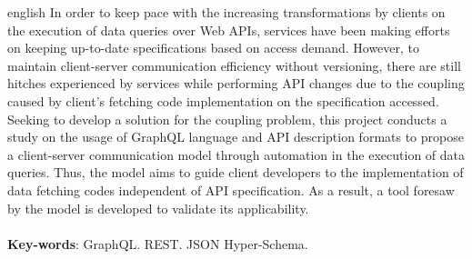\begin{resumo}[Abstract]
  \begin{otherlanguage*}{english}
    In order to keep pace with the increasing transformations by clients on the execution of data queries over Web APIs, services have been making efforts on keeping up-to-date specifications based on access demand. However, to maintain client-server communication efficiency without versioning, there are still hitches experienced by services while performing API changes due to the coupling caused by client's fetching code implementation on the specification accessed. Seeking to develop a solution for the coupling problem, this project conducts a study on the usage of GraphQL language and API description formats to propose a client-server communication model through automation in the execution of data queries. Thus, the model aims to guide client developers to the implementation of data fetching codes independent of API specification. As a result, a tool foresaw by the model is developed to validate its applicability. \\ \\
    \textbf{Key-words}: GraphQL. REST. JSON Hyper-Schema.
  \end{otherlanguage*}
\end{resumo}
